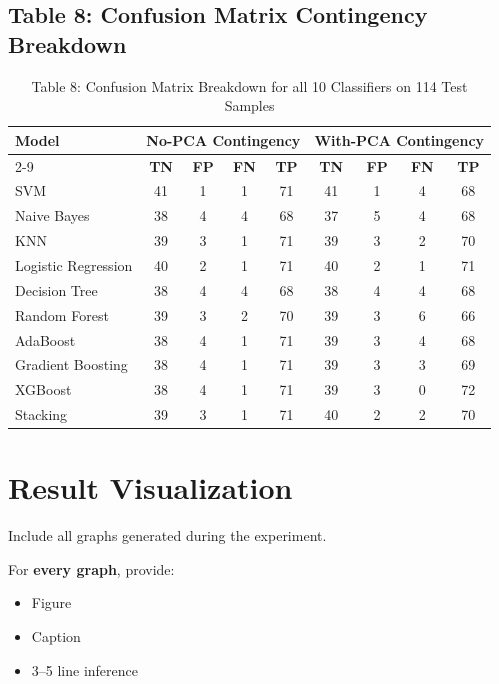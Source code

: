 \documentclass[12pt,a4paper]{article}
\begin{document}
\subsection*{Table 8: Confusion Matrix Contingency Breakdown}
\begin{table}[H]
\centering
\begin{tabular}{|l|cccc|cccc|}
\hline
\multirow{2}{*}{\textbf{Model}} & \multicolumn{4}{c|}{\textbf{No-PCA Contingency}} & \multicolumn{4}{c|}{\textbf{With-PCA Contingency}} \\ \cline{2-9}
& \textbf{TN} & \textbf{FP} & \textbf{FN} & \textbf{TP} & \textbf{TN} & \textbf{FP} & \textbf{FN} & \textbf{TP} \\ \hline
SVM & 41 & 1 & 1 & 71 & 41 & 1 & 4 & 68 \\ \hline
Naive Bayes & 38 & 4 & 4 & 68 & 37 & 5 & 4 & 68 \\ \hline
KNN & 39 & 3 & 1 & 71 & 39 & 3 & 2 & 70 \\ \hline
Logistic Regression & 40 & 2 & 1 & 71 & 40 & 2 & 1 & 71 \\ \hline
Decision Tree & 38 & 4 & 4 & 68 & 38 & 4 & 4 & 68 \\ \hline
Random Forest & 39 & 3 & 2 & 70 & 39 & 3 & 6 & 66 \\ \hline
AdaBoost & 38 & 4 & 1 & 71 & 39 & 3 & 4 & 68 \\ \hline
Gradient Boosting & 38 & 4 & 1 & 71 & 39 & 3 & 3 & 69 \\ \hline
XGBoost & 38 & 4 & 1 & 71 & 39 & 3 & 0 & 72 \\ \hline
Stacking & 39 & 3 & 1 & 71 & 40 & 2 & 2 & 70 \\ \hline
\end{tabular}
\caption{Table 8: Confusion Matrix Breakdown for all 10 Classifiers on 114 Test Samples}
\label{tab:exp7_cm_table}
\end{table}

\section{Result Visualization}

Include all graphs generated during the experiment.

For \textbf{every graph}, provide:
\begin{itemize}
\item Figure
\item Caption
\item 3--5 line inference
\end{itemize}
\end{document}
